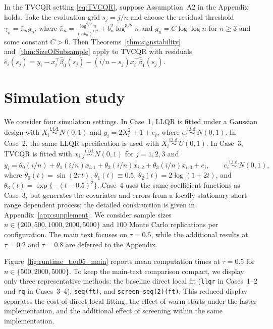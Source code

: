 \documentclass[lineno]{biometrika}
\begin{document}
\begin{corollary}
\label{cor:tvcqr}
In the TVCQR setting \eqref{eq:TVCQR}, suppose Assumption~A2 in the Appendix holds.
Take the evaluation grid $s_j=j/n$ and choose the residual threshold $\gamma_n=\bar\pi_n g_n$, where 
$\bar\pi_n=\frac{\log^{9/2} n}{(nb_n)^{1/2}}+b_n^2\log^{3/2} n$ and $g_n=C\log\log n$ for $n\ge 3$ and some constant $C>0$. 
Then Theorems~\ref{thm:signstability} and~\ref{thm:SizeOfSubsample} apply to TVCQR with residuals
$\hat e_i(s_j)=y_i-x_i^\top\hat\beta_0(s_j)-(i/n-s_j)x_i^\top\hat\beta_1(s_j)$.
\end{corollary}






\section{Simulation study}\label{sec:sim}

We consider four simulation settings. In Case~1, LLQR is fitted under a Gaussian design with
$X_i \stackrel{\mathrm{i.i.d.}}{\sim} N(0,1)$ and $y_i = 2X_i^2 + 1 + e_i$, where
$e_i \stackrel{\mathrm{i.i.d.}}{\sim} N(0,1)$. In Case~2, the same LLQR specification is used with
$X_i \stackrel{\mathrm{i.i.d.}}{\sim} U(0,1)$. In Case~3, TVCQR is fitted with
$x_{i,j}\stackrel{\mathrm{i.i.d.}}{\sim}N(0,1)$ for $j=1,2,3$ and
\[
y_i=\theta_0(i/n)+\theta_1(i/n)x_{i,1}+\theta_2(i/n)x_{i,2}+\theta_3(i/n)x_{i,3}+e_i,
\qquad e_i \stackrel{\mathrm{i.i.d.}}{\sim} N(0,1),
\]
where $\theta_0(t)=\sin(2\pi t)$, $\theta_1(t)\equiv 0.5$, $\theta_2(t)=2\log(1+2t)$, and
$\theta_3(t)=\exp\{-(t-0.5)^2\}$. Case~4 uses the same coefficient functions as Case~3, but generates the covariates
and errors from a locally stationary short-range dependent process; the detailed construction is given in
Appendix~\ref{app:supplement}. We consider sample sizes $n\in\{200,500,1000,2000,5000\}$ and $100$ Monte Carlo
replications per configuration. The main text focuses on $\tau=0.5$, while the additional results at
$\tau=0.2$ and $\tau=0.8$ are deferred to the Appendix.

Figure~\ref{fig:runtime_tau05_main} reports mean computation times at $\tau=0.5$ for
$n\in\{500,2000,5000\}$. To keep the main-text comparison compact, we display only three representative methods: the
baseline direct local fit (\texttt{llqr} in Cases~1--2 and \texttt{rq} in Cases~3--4), \texttt{seq(ft)}, and
\texttt{screen-seq(2)(ft)}. This reduced display separates the cost of direct local fitting, the effect of warm starts
under the faster implementation, and the additional effect of screening within the same implementation.
\end{document}
